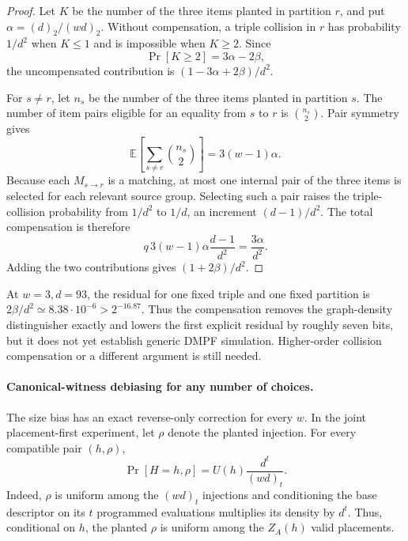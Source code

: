 \begin{proof}
Let $K$ be the number of the three items planted in partition $r$, and put
$\alpha=(d)_2/(wd)_2$.  Without compensation, a triple collision in $r$ has
probability $1/d^2$ when $K\leq1$ and is impossible when $K\geq2$.  Since
\[
 \Pr[K\geq2]=3\alpha-2\beta,
\]
the uncompensated contribution is $(1-3\alpha+2\beta)/d^2$.

For $s\neq r$, let $n_s$ be the number of the three items planted in
partition $s$.  The number of item pairs eligible for an equality from $s$ to
$r$ is $\binom{n_s}{2}$.  Pair symmetry gives
\[
 \mathbb E\left[\sum_{s\neq r}\binom{n_s}{2}\right]
 =3(w-1)\alpha.
\]
Because each $M_{s\mathbin\to r}$ is a matching, at most one internal pair of
the three items is selected for each relevant source group.  Selecting such a
pair raises the triple-collision probability from $1/d^2$ to $1/d$, an
increment $(d-1)/d^2$.  The total compensation is therefore
\[
 q\,3(w-1)\alpha\frac{d-1}{d^2}=\frac{3\alpha}{d^2}.
\]
Adding the two contributions gives $(1+2\beta)/d^2$.
\end{proof}

At $w=3,d=93$, the residual for one fixed triple and one fixed partition is
$2\beta/d^2\simeq8.38\cdot10^{-6}>2^{-16.87}$.  Thus the compensation removes
the graph-density distinguisher exactly and lowers the first explicit residual
by roughly seven bits, but it does not yet establish generic DMPF simulation.
Higher-order collision compensation or a different argument is still needed.

\paragraph{Canonical-witness debiasing for any number of choices.}
The size bias has an exact reverse-only correction for every $w$.  In the
joint placement-first experiment, let $\rho$ denote the planted injection.
For every compatible pair $(h,\rho)$,
\begin{equation}\label{eq:rev-cuckoo-joint-witness-density}
 \Pr[H=h,\rho]
 =U(h)\frac{d^t}{(wd)_t}.
\end{equation}
Indeed, $\rho$ is uniform among the $(wd)_t$ injections and conditioning the
base descriptor on its $t$ programmed evaluations multiplies its density by
$d^t$.  Thus, conditional on $h$, the planted $\rho$ is uniform among the
$Z_A(h)$ valid placements.

